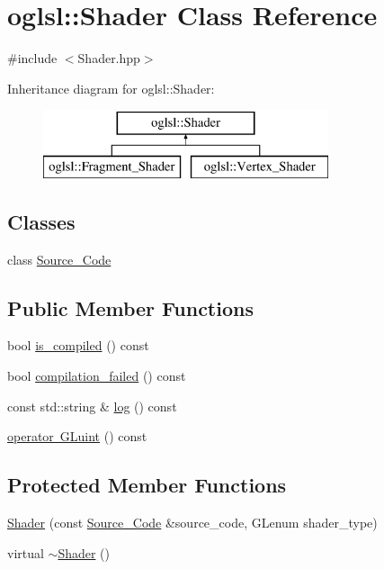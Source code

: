 \hypertarget{classoglsl_1_1_shader}{}\section{oglsl\+:\+:Shader Class Reference}
\label{classoglsl_1_1_shader}


{\ttfamily \#include $<$Shader.\+hpp$>$}

Inheritance diagram for oglsl\+:\+:Shader\+:\begin{figure}[H]
\begin{center}
\leavevmode
\includegraphics[height=2.000000cm]{classoglsl_1_1_shader}
\end{center}
\end{figure}
\subsection*{Classes}
\begin{DoxyCompactItemize}
\item 
class \mbox{\hyperlink{classoglsl_1_1_shader_1_1_source___code}{Source\+\_\+\+Code}}
\end{DoxyCompactItemize}
\subsection*{Public Member Functions}
\begin{DoxyCompactItemize}
\item 
bool \mbox{\hyperlink{classoglsl_1_1_shader_ade2f39e7d78cf5ac226fbe05b136b1c9}{is\+\_\+compiled}} () const
\item 
bool \mbox{\hyperlink{classoglsl_1_1_shader_a3de1ced039ae0d724d062263345d42ef}{compilation\+\_\+failed}} () const
\item 
const std\+::string \& \mbox{\hyperlink{classoglsl_1_1_shader_a5556801b4f5dffa82d3835003a73184a}{log}} () const
\item 
\mbox{\hyperlink{classoglsl_1_1_shader_af1bd8a3a30dff0e4f1c0e110db845169}{operator G\+Luint}} () const
\end{DoxyCompactItemize}
\subsection*{Protected Member Functions}
\begin{DoxyCompactItemize}
\item 
\mbox{\hyperlink{classoglsl_1_1_shader_a1560f72ace8a035eb367857156c0366f}{Shader}} (const \mbox{\hyperlink{classoglsl_1_1_shader_1_1_source___code}{Source\+\_\+\+Code}} \&source\+\_\+code, G\+Lenum shader\+\_\+type)
\item 
virtual \mbox{\hyperlink{classoglsl_1_1_shader_aea6c7b3bc4113abb6228dec6245b829a}{$\sim$\+Shader}} ()
\end{DoxyCompactItemize}


